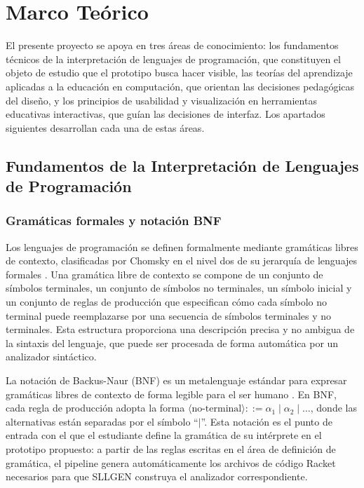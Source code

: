 \section{Marco Teórico}

El presente proyecto se apoya en tres áreas de conocimiento: los fundamentos técnicos de la interpretación de lenguajes de programación, que constituyen el objeto de estudio que el prototipo busca hacer visible, las teorías del aprendizaje aplicadas a la educación en computación, que orientan las decisiones pedagógicas del diseño, y los principios de usabilidad y visualización en herramientas educativas interactivas, que guían las decisiones de interfaz. Los apartados siguientes desarrollan cada una de estas áreas.

\subsection{Fundamentos de la Interpretación de Lenguajes de Programación}

\subsubsection{Gramáticas formales y notación BNF}

Los lenguajes de programación se definen formalmente mediante gramáticas libres de contexto, clasificadas por Chomsky en el nivel dos de su jerarquía de lenguajes formales \cite{gordon2024linguistics}. Una gramática libre de contexto se compone de un conjunto de símbolos terminales, un conjunto de símbolos no terminales, un símbolo inicial y un conjunto de reglas de producción que especifican cómo cada símbolo no terminal puede reemplazarse por una secuencia de símbolos terminales y no terminales. Esta estructura proporciona una descripción precisa y no ambigua de la sintaxis del lenguaje, que puede ser procesada de forma automática por un analizador sintáctico.

La notación de Backus-Naur (BNF) es un metalenguaje estándar para expresar gramáticas libres de contexto de forma legible para el ser humano \cite{aho2006compilers}. En BNF, cada regla de producción adopta la forma $\langle\text{no-terminal}\rangle \mathrel{::=} \alpha_1 \mid \alpha_2 \mid \ldots$, donde las alternativas están separadas por el símbolo ``$|$''. Esta notación es el punto de entrada con el que el estudiante define la gramática de su intérprete en el prototipo propuesto: a partir de las reglas escritas en el área de definición de gramática, el pipeline genera automáticamente los archivos de código Racket necesarios para que SLLGEN construya el analizador correspondiente.

